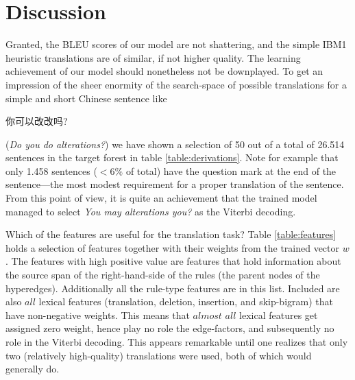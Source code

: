 \documentclass[11pt,a4paper]{article}
\begin{document}
\section{Discussion}

Granted, the BLEU scores of our model are not shattering, and the simple IBM1 heuristic translations are of similar, if not higher quality. The learning achievement of our model should nonetheless not be downplayed. To get an impression of the sheer enormity of the search-space of possible translations for a simple and short Chinese sentence like \begin{CJK}{UTF8}{gbsn}你可以改改吗?\end{CJK} (\textit{Do you do alterations?}) we have shown a selection of 50 out of a total of 26.514 sentences in the target forest in table \ref{table:derivations}. Note for example that only 1.458 sentences ($<6\%$ of total) have the question mark at the end of the sentence---the most modest requirement for a proper translation of the sentence. From this point of view, it is quite an achievement that the trained model managed to select \textit{You may alterations you?} as the Viterbi decoding.

Which of the features are useful for the translation task? Table \ref{table:features} holds a selection of features together with their weights from the trained vector $w$. The features with high positive value are features that hold information about the source span of the right-hand-side of the rules (the parent nodes of the hyperedges). Additionally all the rule-type features are in this list. Included are also $all$ lexical features (translation, deletion, insertion, and skip-bigram) that have non-negative weights. This means that $almost$ $all$ lexical features get assigned zero weight, hence play no role the edge-factors, and subsequently no role in the Viterbi decoding. This appears remarkable until one realizes that only two (relatively high-quality) translations were used, both of which would generally do.
\end{document}
